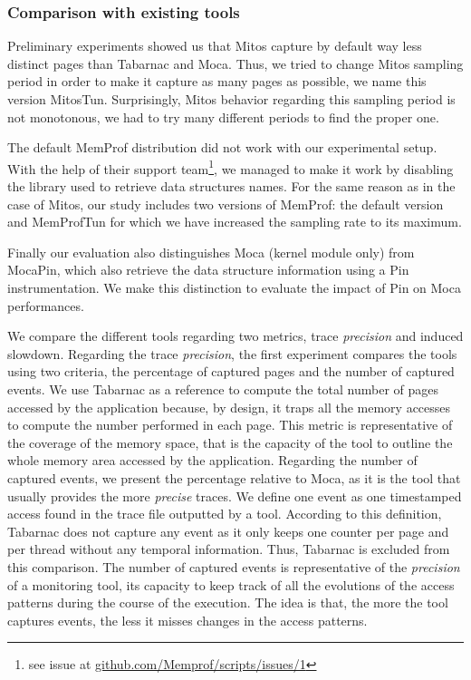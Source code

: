 \subsubsection{Comparison with existing tools}

Preliminary experiments showed us that \gls{Mitos} capture by
default way less distinct pages than \gls{Tabarnac} and \gls{Moca}. Thus, we tried to change \gls{Mitos}
sampling period in order to make it capture as many pages as possible,
we name this version MitosTun. Surprisingly, \gls{Mitos} behavior regarding this sampling period
is not monotonous, we had to try many different periods to find the proper one.

The default \gls{MemProf} distribution did not work with our experimental setup. With the help
of their support team\footnote{see issue at
    \href{https://github.com/Memprof/scripts/issues/1}{github.com/Memprof/scripts/issues/1}}, we managed to make it work by disabling the library used to retrieve
data structures names. For the same reason as in the case of \gls{Mitos}, our study includes
two versions of \gls{MemProf}: the default version and MemProfTun for which we have
increased the sampling rate to its maximum.

Finally our evaluation also distinguishes \gls{Moca} (kernel module only) from
\gls{Moca}Pin, which also retrieve the data structure information using a Pin
instrumentation. We make this distinction to evaluate the impact of Pin on
\gls{Moca} performances.

We compare the different tools regarding two metrics, trace \emph{precision} and induced slowdown. Regarding the trace \emph{precision}, the first experiment compares the tools
using two criteria, the
percentage of captured pages and the number of captured events.  We use \gls{Tabarnac} as a reference to compute the total number of pages accessed by the
application because, by design, it traps all the memory accesses to compute the number performed in each page. This metric is representative of the coverage of the
memory space, that is the capacity of the tool to outline the whole memory area accessed by the application. Regarding the number of captured events, we present the percentage
relative to \gls{Moca}, as it is the tool that usually provides the more \emph{precise} traces. We define one event as one
timestamped access found in the trace file outputted by a tool. According to this definition, \gls{Tabarnac} does not capture any event as it only keeps one
counter per page and per thread without any temporal information. Thus, \gls{Tabarnac} is excluded from this comparison. The number of captured events is representative
of the \emph{precision} of a monitoring tool, its capacity to keep track of all the evolutions of the access patterns during the course of the execution. The idea is
that, the more the tool captures events, the less it misses changes in the access patterns.

